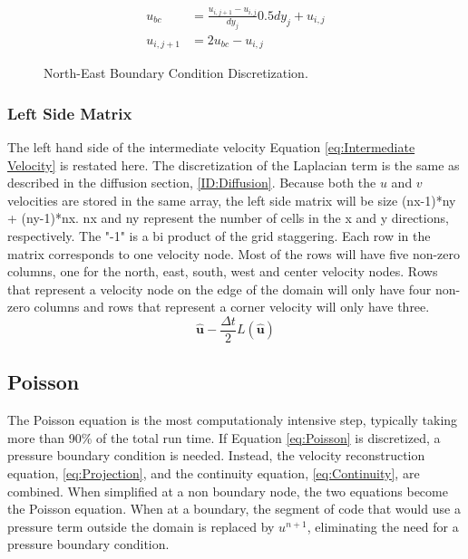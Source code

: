 \documentclass[onehalf,11pt]{beavtex}
\begin{document}
\begin{align}
u_{bc} &= \frac{u_{i,j+1} - u_{i,j}}{dy_j}0.5dy_j+ u_{i,j} \label{eq:bc extrapolation} \\
u_{i,j+1} &= 2u_{bc} - u_{i,j} \; \label{eq:bc extrapolation simplified}
\end{align}

\begin{figure}[htb]
	\centering
	
	\caption{North-East Boundary Condition Discretization.}
	\label{fig:ID iv bc}
\end{figure}
\subsubsection{Left Side Matrix}
The left hand side of the intermediate velocity Equation \eqref{eq:Intermediate Velocity} is restated here. 
The discretization of the Laplacian term is the same as described in the diffusion section, \ref{ID:Diffusion}. 
Because both the $u$ and $v$ velocities are stored in the same array, the left side matrix will be size (nx-1)*ny + (ny-1)*nx. 
nx and ny represent the number of cells in the x and y directions, respectively.
The "-1" is a bi product of the grid staggering.
Each row in the matrix corresponds to one velocity node.
Most of the rows will have five non-zero columns, one for the north, east, south, west and center velocity nodes.
Rows that represent a velocity node on the edge of the domain will only have four non-zero columns and rows that represent a corner velocity will only have three.
\begin{equation}
\hat{\textbf{u}} - \frac{\Delta t}{2}L(\hat{\textbf{u}})
\end{equation}
\subsection{Poisson}
The Poisson equation is the most computationaly intensive step, typically taking more than 90\% of the total run time.
If Equation \eqref{eq:Poisson} is discretized, a pressure boundary condition is needed.
Instead, the velocity reconstruction equation, \eqref{eq:Projection}, and the continuity equation, \eqref{eq:Continuity}, are combined.
When simplified at a non boundary node, the two equations become the Poisson equation.
When at a boundary, the segment of code that would use a pressure term outside the domain is replaced by $u^{n+1}$, eliminating the need for a pressure boundary condition.
\end{document}
